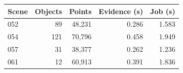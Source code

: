 \begin{tabular}{lrrrr}
\toprule
Scene & Objects & Points & Evidence (s) & Job (s) \\
\midrule
052 & 89 & 48,231 & 0.286 & 1.583 \\
054 & 121 & 70,796 & 0.458 & 1.949 \\
057 & 31 & 38,377 & 0.262 & 1.236 \\
061 & 12 & 60,913 & 0.391 & 1.836 \\
\bottomrule
\end{tabular}
